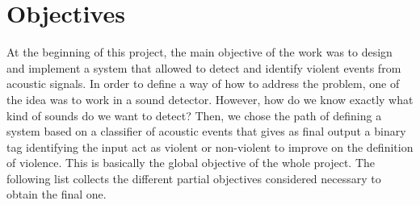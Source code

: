 	
	
\section{Objectives}
\label{section:objectives}

	At the beginning of this project, the main objective of the work was to design and implement a system that allowed to detect and identify violent events from acoustic signals. In order to define a way of how to address the problem, one of the idea was to work in a sound detector. However, how do we know exactly what kind of sounds do we want to detect? Then, we chose the path of defining a system based on a classifier of acoustic events that gives as final output a binary tag identifying the input act as violent or non-violent to improve on the definition of violence. This is basically the global objective of the whole project. The following list collects the different partial objectives considered necessary to obtain the final one.
	
